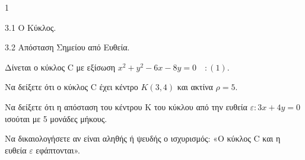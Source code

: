 \begin{ylh}{1}
    \item 3.1 Ο Κύκλος.
    \item 3.2 Απόσταση Σημείου από Ευθεία.
\end{ylh}
Δίνεται ο κύκλος C με εξίσωση $x^2 + y^2 - 6x - 8y = 0 \quad :(1)$.
\begin{alist}
\item Να δείξετε ότι ο κύκλος C έχει κέντρο $K(3,4)$ και ακτίνα $\rho=5$.  
\item Να δείξετε ότι η απόσταση του κέντρου K του κύκλου από την ευθεία $\varepsilon: 3x + 4y = 0$ ισούται με 5 μονάδες μήκους.  
\item Να δικαιολογήσετε αν είναι αληθής ή ψευδής ο ισχυρισμός: «Ο κύκλος C και η ευθεία $\varepsilon$ εφάπτονται».  
\end{alist}